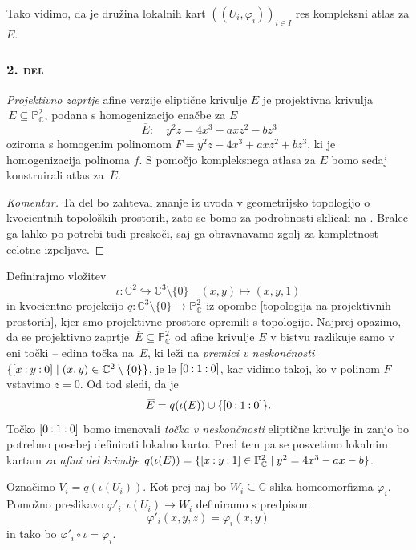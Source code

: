 \documentclass[mat1]{fmfdelo}
\numberwithin{equation}{section}
\newcommand{\C}{\mathbb C}
\newcommand{\PC}{\mathbb{P}^2_\C}
\newcommand{\oio}{\pcoor{0: 1 : 0}}
\newcommand{\pcoor}[1]{%
\begingroup\lccode`~=`: \lowercase{\endgroup
\edef~}{\mathbin{\mathchar\the\mathcode`:}\nobreak}%
\left[%
\begingroup
\mathcode`:=\string"8000
#1%
\endgroup
\right]%
}
\newcommand{\olsi}[1]{\,\overline{\!{#1}}} %
\theoremstyle{definition}
\newenvironment{komentar}[1][Komentar]{\begin{proof}[#1]\let\qed\relax}{\end{proof}}
\begin{document}
Tako vidimo, da je družina lokalnih kart $((U_i, \varphi_i))_{i \in I}$ res kompleksni atlas za $E$. 

\subsubsection*{\textsc{2. del}} 
\emph{Projektivno zaprtje} afine verzije eliptične krivulje $E$ je projektivna krivulja $\olsi{E} \subseteq \PC$, podana s homogenizacijo enačbe za $E$
\[
    \olsi{E} : \quad y^2z = 4x^3 - axz^2 - bz^3  
\]
oziroma s homogenim polinomom $F = y^2z - 4x^3 + axz^2 + bz^3$, ki je homogenizacija polinoma $f$. S pomočjo kompleksnega atlasa za $E$ bomo sedaj konstruirali atlas za $\olsi{E}$. 

\begin{komentar}
    Ta del bo zahteval znanje iz uvoda v geometrijsko topologijo o kvocientnih topoloških prostorih, zato se bomo za podrobnosti sklicali na \cite[poglavje 3.2.]{MrcunTop}. Bralec ga lahko po potrebi tudi preskoči, saj ga obravnavamo zgolj za kompletnost celotne izpeljave. 
\end{komentar}

Definirajmo vložitev 
\[
    \iota: \C^2 \hookrightarrow \C^3\setminus\{0\} \quad (x,y) \mapsto (x,y,1)
\]
in kvocientno projekcijo $q : \C^3 \setminus \{0\} \to \PC$ iz opombe \ref{topologija na projektivnih prostorih}, kjer smo projektivne prostore opremili s topologijo. Najprej opazimo, da se projektivno zaprtje $\olsi{E} \subseteq \PC$ od afine krivulje $E$ v bistvu razlikuje samo v eni točki -- edina točka na $\olsi{E}$, ki leži na \emph{premici v neskončnosti} $\{\pcoor{x : y : 0} \mid (x,y) \in \C^2\setminus\{0\}\}$, je le $\oio$, kar vidimo takoj, ko v polinom $F$ vstavimo $z = 0$. Od tod sledi, da je 
\[
    \olsi{E} = q(\iota(E)) \cup \{\pcoor{0 : 1 : 0}\}.
\] 
Točko $\pcoor{0 : 1 : 0}$ bomo imenovali \emph{točka v neskončnosti} eliptične krivulje in zanjo bo potrebno posebej definirati lokalno karto. Pred tem pa se posvetimo lokalnim kartam za \emph{afini del krivulje} $q(\iota(E)) = \{ \pcoor{x : y : 1} \in \PC \mid y^2 = 4x^3 - ax - b\}$.

Označimo $V_i = q(\iota(U_i))$. Kot prej naj bo $W_i \subseteq \C$ slika homeomorfizma $\varphi_i$. Pomožno preslikavo $\varphi'_i : \iota(U_i) \to W_i$ definiramo s predpisom 
\[
    \varphi'_i(x,y,z) = \varphi_i(x,y)
\]
in tako bo $\varphi'_i \circ \iota = \varphi_i$.
\end{document}
